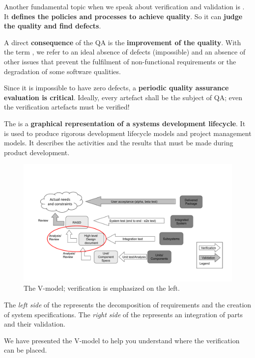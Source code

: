 \highspace
Another fundamental topic when we speak about verification and validation is . It \textbf{defines the policies and processes to achieve quality}. So it can \textbf{judge the quality and find defects}. 

A direct \textbf{consequence} of the QA is the \textbf{improvement of the quality}. With the term , we refer to an ideal absence of defects (impossible) and an absence of other issues that prevent the fulfilment of non-functional requirements or the degradation of some software qualities.

\highspace
Since it is impossible to have zero defects, a \textbf{periodic quality assurance evaluation is critical}. Ideally, every artefact shall be the subject of QA; even the verification artefacts must be verified!

\newpage

\noindent
The  is a \textbf{graphical representation of a systems development lifecycle}. It is used to produce rigorous development lifecycle models and project management models. It describes the activities and the results that must be made during product development.

\begin{figure}[!htp]
    \centering
    \includegraphics[width=\textwidth]{img/v-model-1.pdf}
    \caption{The V-model; verification is emphasized on the left.}
\end{figure}

\noindent
The \emph{left side} of the  represents the decomposition of requirements and the creation of system specifications. The \emph{right side} of the  represents an integration of parts and their validation.

\highspace
We have presented the V-model to help you understand where the verification can be placed.

